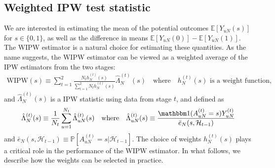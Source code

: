 \documentclass[12pt]{article}
\def\P{\mathbb{P}}
\def\P{\mathbb{P}}
\newcommand{\E}{\mathbb E}								%
\renewcommand{\P}{\mathbb{P}}							%
\newcommand{\indicator}{\mathbbm 1}						%
\newcommand{\WIPW}{\mathrm{WIPW}}
\begin{document}
\subsection{Weighted IPW test statistic}\label{sec:test_statistic}

We are interested in estimating the mean of the potential outcomes $\E[Y_{uN}(s)]$ for $s\in\{0,1\}$, as well as the difference in means $\E[Y_{uN}(0)] - \E[Y_{uN}(1)]$. The WIPW estimator is a natural choice for estimating these quantities. As the name suggests, the WIPW estimator can be viewed as a weighted average of the IPW estimators from the two stages:
\begin{align}\label{eq:WIPW_estimator}
    \WIPW(s)\equiv \sum_{t=1}^2 \frac{N_t h_{N}^{(t)}(s)}{\sum_{t=1}^2 N_t h_{N}^{(t)}(s)} \hat{\Lambda}_{N}^{(t)}(s)\quad\text{where}\quad h_{N}^{(t)}(s)\text{ is a weight function},
\end{align}
and $\hat{\Lambda}_{N}^{(t)}(s)$ is a IPW statistic using data from stage $t$, and defined as
\begin{align*}
	\hat{\Lambda}_{N}^{(t)}(s) \equiv \frac{1}{N_t}\sum_{u=1}^{N_t} \hat{\Lambda}_{uN}^{(t)}(s) \quad\text{where}\quad \hat{\Lambda}_{uN}^{(t)}(s) \equiv \frac{\indicator(A_{uN}^{(t)} = s) Y_{uN}^{(t)}}{\bar{e}_N(s, \mathcal{H}_{t-1})}
\end{align*}
and $\bar{e}_N(s, \mathcal{H}_{t-1}) \equiv \P[A_{uN}^{(t)} = s |\mathcal{H}_{t-1}]$. The choice of weights \(h_{N}^{(t)}(s)\) plays a critical role in the performance of the WIPW estimator. In what follows, we describe how the weights can be selected in practice.
\end{document}
